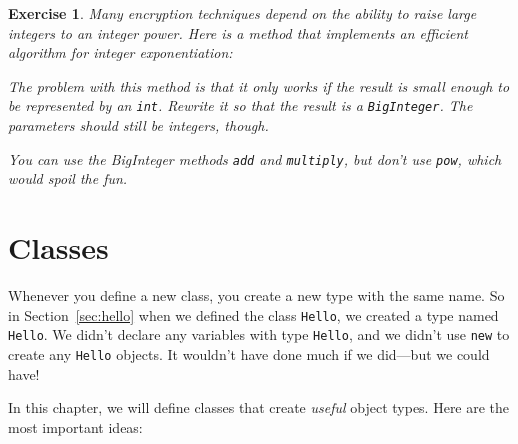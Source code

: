 \documentclass[12pt]{book}
\theoremstyle{exercise}
\newtheorem{exercise}{Exercise}[chapter]
\newcommand{\java}[1]{\verb"#1"}
\newcommand{\java}[1]{\lstinline{#1}} %
\begin{document}
\begin{exercise}
Many encryption techniques depend on the ability to raise large integers to an integer power.
Here is a method that implements an efficient algorithm for integer exponentiation:


The problem with this method is that it only works if the result is small enough to be represented by an \java{int}.
Rewrite it so that the result is a \java{BigInteger}.
The parameters should still be integers, though.

You can use the BigInteger methods \java{add} and \java{multiply}, but don't use \java{pow}, which would spoil the fun.
\end{exercise}


\chapter{Classes}


Whenever you define a new class, you create a new type with the same name.
So in Section~\ref{sec:hello} when we defined the class \java{Hello}, we created a type named \java{Hello}.
We didn't declare any variables with type \java{Hello}, and we didn't use \java{new} to create any \java{Hello} objects.
It wouldn't have done much if we did---but we could have!

In this chapter, we will define classes that create {\em useful} object types.
Here are the most important ideas:
\end{document}
